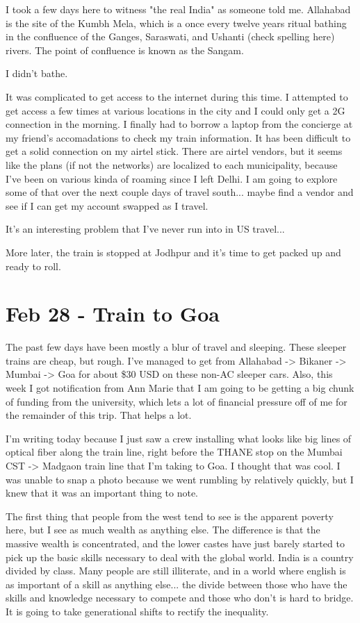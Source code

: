 \documentclass[11pt]{amsart}
\begin{document}
I took a few days here to witness "the real India" as someone told me. Allahabad is the site of the Kumbh Mela, which is a once every twelve years ritual bathing in the confluence of the Ganges, Saraswati, and Ushanti (check spelling here) rivers. The point of confluence is known as the Sangam.

I didn't bathe.

It was complicated to get access to the internet during this time. I attempted to get access a few times at various locations in the city and I could only get a 2G connection in the morning. I finally had to borrow a laptop from the concierge at my friend's accomadations to check my train information. It has been difficult to get a solid connection on my airtel stick. There are airtel vendors, but it seems like the plans (if not the networks) are localized to each municipality, because I've been on various kinda of roaming since I left Delhi. I am going to explore some of that over the next couple days of travel south... maybe find a vendor and see if I can get my account swapped as I travel.

It's an interesting problem that I've never run into in US travel...

More later, the train is stopped at Jodhpur and it's time to get packed up and ready to roll.

\section{Feb 28 - Train to Goa}

The past few days have been mostly a blur of travel and sleeping. These sleeper trains are cheap, but rough. I've managed to get from Allahabad -> Bikaner -> Mumbai -> Goa for about \$30 USD on these non-AC sleeper cars. Also, this week I got notification from Ann Marie that I am going to be getting a big chunk of funding from the university, which lets a lot of financial pressure off of me for the remainder of this trip. That helps a lot.

I'm writing today because I just saw a crew installing what looks like big lines of optical fiber along the train line, right before the THANE stop on the Mumbai CST -> Madgaon train line that I'm taking to Goa. I thought that was cool. I was unable to snap a photo because we went rumbling by relatively quickly, but I knew that it was an important thing to note.

The first thing that people from the west tend to see is the apparent poverty here, but I see as much wealth as anything else. The difference is that the massive wealth is concentrated, and the lower castes have just barely started to pick up the basic skills necessary to deal with the global world. India is a country divided by class. Many people are still illiterate, and in a world where english is as important of a skill as anything else...  the divide between those who have the skills and knowledge necessary to compete and those who don't is hard to bridge. It is going to take generational shifts to rectify the inequality.
\end{document}
